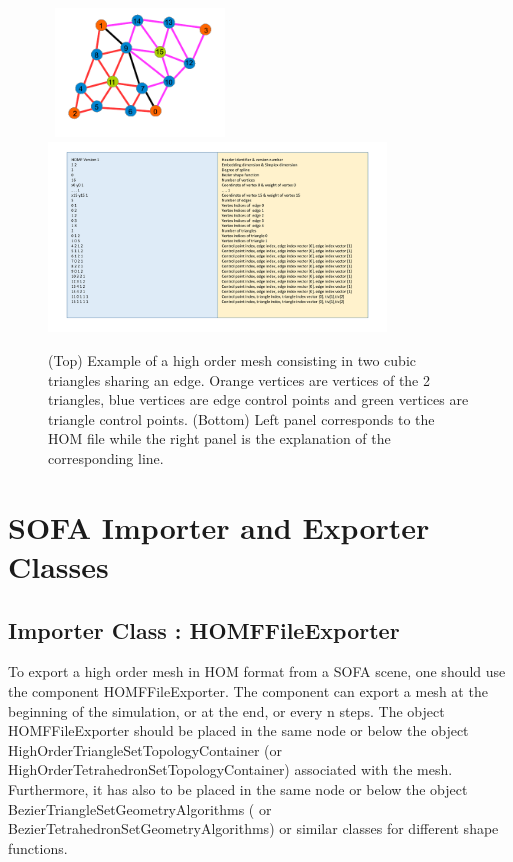 \documentclass[a4paper,11pt]{article}
\begin{document}
\begin{figure}[!htbp]
	\centering
\mbox{    \includegraphics[width=0.40\textwidth]{exampleHOM}}
\mbox{		  \includegraphics[width=0.80\textwidth]{HOMFormat}}
	\caption{(Top) Example of a high order mesh consisting in two cubic triangles sharing an edge. Orange vertices are vertices of the 2 triangles, blue vertices are edge control points and green vertices are triangle control points. (Bottom) Left panel corresponds to the HOM file while the right panel is the explanation of the corresponding line.}
	\label{fig:HOMFormat}
\end{figure}

\section{SOFA Importer and Exporter Classes}

\subsection{Importer Class : HOMFFileExporter}

To export a high order mesh in HOM format from a SOFA scene, one should use the component HOMFFileExporter. The component can export a mesh at the beginning of the simulation, or at the end, or every n steps. The object HOMFFileExporter should be placed in the same node or below the object  HighOrderTriangleSetTopologyContainer (or HighOrderTetrahedronSetTopologyContainer) associated with the mesh. Furthermore, it has also to be placed in the same node or below the object BezierTriangleSetGeometryAlgorithms ( or BezierTetrahedronSetGeometryAlgorithms) or similar classes for different shape functions.
\end{document}
